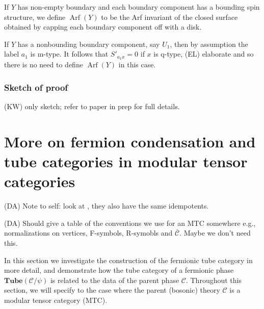 \documentclass[12pt,a4paper]{article}
\newcommand{\mcc}{\mathcal{C}}
\newcommand{\tube}{\textbf{Tube}}
\DeclareMathOperator{\Arf}{Arf}
\newcommand{\kw}[1]{{\color{kwcolor}\footnotesize{(KW) #1}}}
\newcommand{\dave}[1]{{\color{ao(english)}\footnotesize{(DA) #1}}}
\newcommand{\ethan}[1]{{\color{amethyst}\footnotesize{(EL) #1}}}
\begin{document}
If $Y$ has non-empty boundary and each boundary component has a bounding spin structure, 
we define $\Arf(Y)$ to be the Arf invariant of the closed 
surface obtained by capping each boundary component off with a disk.

If $Y$ has a nonbounding boundary component, say $U_1$, then by assumption
the label $a_1$ is m-type.
It follows that $S'_{a_1 x} = 0$ if $x$ is q-type, \ethan{elaborate} 
and so there is no need to define $\Arf(Y)$ in this case.




\subsubsection{Sketch of proof}


\kw{only sketch; refer to paper in prep for full details.}




\section{More on fermion condensation and tube categories in modular tensor categories}

\dave{Note to self: look at \cite{Koenig2010}, they also have the same idempotents.}

\dave{Should give a table of the conventions we use for an MTC somewhere
e.g., normalizations on vertices, F-symbols, R-symobls and $\bar{\mcc}$.
Maybe we don't need this.}

In this section we investigate the construction of the fermionic tube category in more detail, 
and demonstrate how the tube category of a fermionic phase $\tube(\mcc / \psi)$ is related to 
the data of the parent phase $\mcc$. 
Throughout this section, we will specify to the case where the parent (bosonic) theory $\mcc$
is a modular tensor category (MTC).
\end{document}
